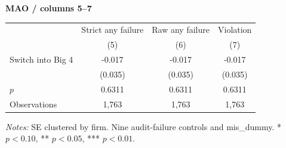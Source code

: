\documentclass[10pt]{article}
\begin{document}
\medskip\textbf{MAO / columns 5--7}\par\smallskip
\begin{tabular*}{\textwidth}{@{\extracolsep{\fill}}lccc@{}}
\toprule
 & Strict any failure & Raw any failure & Violation \\
 & (5) & (6) & (7) \\
\midrule
Switch into Big 4 & -0.017 & -0.017 & -0.017 \\
 & (0.035) & (0.035) & (0.035) \\
$p$ & 0.6311 & 0.6311 & 0.6311 \\
Observations & 1,763 & 1,763 & 1,763 \\
\bottomrule\end{tabular*}\par
\medskip\fontsize{9}{11}\selectfont\textit{Notes:} SE clustered by firm. Nine audit-failure controls and mis\_dummy. * $p<0.10$, ** $p<0.05$, *** $p<0.01$.
\end{document}
